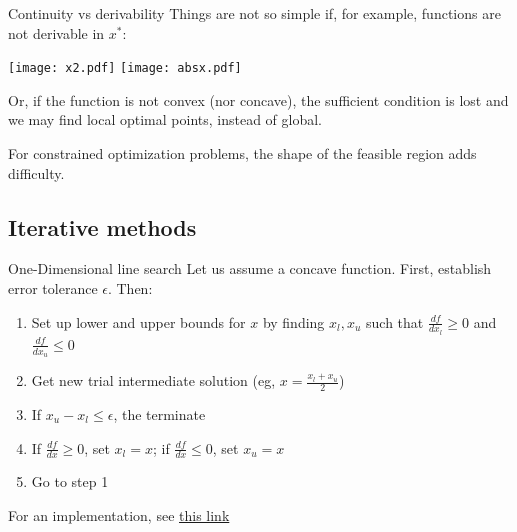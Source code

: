 \documentclass[c]{beamer}
\begin{document}
\begin{frame}[t]{Continuity vs derivability}
  Things are not so simple if, for example, functions are not derivable in $x^*$:
  \begin{center}
    \texttt{[image: x2.pdf]}
    \texttt{[image: absx.pdf]}
  \end{center}
  Or, if the function is not convex (nor concave), the sufficient condition is lost and we may find local optimal points, instead of global.

  For constrained optimization problems, the shape of the feasible region adds difficulty.
\end{frame}




\subsection{Iterative methods}

\begin{frame}[allowframebreaks]{One-Dimensional line search}
Let us assume a concave function. First, establish error tolerance $\epsilon$. Then:
  \begin{enumerate}
    \item Set up lower and upper bounds for $x$ by finding $x_l,x_u$ such that $\frac{df}{dx_l}\geq 0$ and $\frac{df}{dx_u}\leq 0$
    \item Get new trial intermediate solution (eg, $x=\frac{x_l+x_u}{2}$)
    \item If $x_u-x_l\leq \epsilon$, the terminate
    \item If $\frac{df}{dx}\geq 0$, set $x_l=x$; if $\frac{df}{dx}\leq 0$, set $x_u=x$
    \item Go to step 1
  \end{enumerate}

  For an implementation, see \href{https://machinelearningmastery.com/line-search-optimization-with-python/}{this link}
\end{frame}
\end{document}

